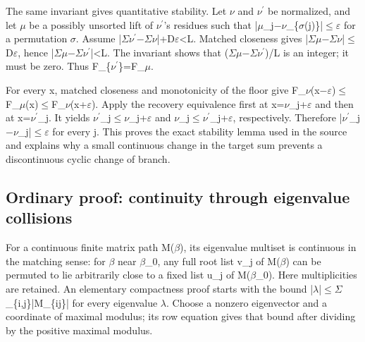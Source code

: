 \documentclass[11pt,a4paper]{article}
\begin{document}
The same invariant gives quantitative stability. Let \ensuremath{\nu} and \ensuremath{\nu}\ensuremath{^{\prime}} be normalized, and let \ensuremath{\mu} be a possibly unsorted lift of \ensuremath{\nu}\ensuremath{^{\prime}}'s residues such that |\ensuremath{\mu}\_j\ensuremath{-}\ensuremath{\nu}\_\{\ensuremath{\sigma}(j)\}|\ensuremath{\leq}\ensuremath{\varepsilon} for a permutation \ensuremath{\sigma}. Assume |\ensuremath{\Sigma}\ensuremath{\nu}\ensuremath{^{\prime}}\ensuremath{-}\ensuremath{\Sigma}\ensuremath{\nu}|+D\ensuremath{\varepsilon}<L. Matched closeness gives |\ensuremath{\Sigma}\ensuremath{\mu}\ensuremath{-}\ensuremath{\Sigma}\ensuremath{\nu}|\ensuremath{\leq}D\ensuremath{\varepsilon}, hence |\ensuremath{\Sigma}\ensuremath{\mu}\ensuremath{-}\ensuremath{\Sigma}\ensuremath{\nu}\ensuremath{^{\prime}}|<L. The invariant shows that (\ensuremath{\Sigma}\ensuremath{\mu}\ensuremath{-}\ensuremath{\Sigma}\ensuremath{\nu}\ensuremath{^{\prime}})/L is an integer; it must be zero. Thus F\_\{\ensuremath{\nu}\ensuremath{^{\prime}}\}=F\_\ensuremath{\mu}.

For every x, matched closeness and monotonicity of the floor give F\_\ensuremath{\nu}(x\ensuremath{-}\ensuremath{\varepsilon})\ensuremath{\leq}F\_\ensuremath{\mu}(x)\ensuremath{\leq}F\_\ensuremath{\nu}(x+\ensuremath{\varepsilon}). Apply the recovery equivalence first at x=\ensuremath{\nu}\_j+\ensuremath{\varepsilon} and then at x=\ensuremath{\nu}\ensuremath{^{\prime}}\_j. It yields \ensuremath{\nu}\ensuremath{^{\prime}}\_j\ensuremath{\leq}\ensuremath{\nu}\_j+\ensuremath{\varepsilon} and \ensuremath{\nu}\_j\ensuremath{\leq}\ensuremath{\nu}\ensuremath{^{\prime}}\_j+\ensuremath{\varepsilon}, respectively. Therefore |\ensuremath{\nu}\ensuremath{^{\prime}}\_j\ensuremath{-}\ensuremath{\nu}\_j|\ensuremath{\leq}\ensuremath{\varepsilon} for every j. This proves the exact stability lemma used in the source and explains why a small continuous change in the target sum prevents a discontinuous cyclic change of branch.

\subsection{Ordinary proof: continuity through eigenvalue collisions}
For a continuous finite matrix path M(\ensuremath{\beta}), its eigenvalue multiset is continuous in the matching sense: for \ensuremath{\beta} near \ensuremath{\beta}\_0, any full root list v\_j of M(\ensuremath{\beta}) can be permuted to lie arbitrarily close to a fixed list u\_j of M(\ensuremath{\beta}\_0). Here multiplicities are retained. An elementary compactness proof starts with the bound |\ensuremath{\lambda}|\ensuremath{\leq}\ensuremath{\Sigma}\_\{i,j\}|M\_\{ij\}| for every eigenvalue \ensuremath{\lambda}. Choose a nonzero eigenvector and a coordinate of maximal modulus; its row equation gives that bound after dividing by the positive maximal modulus.
\end{document}
